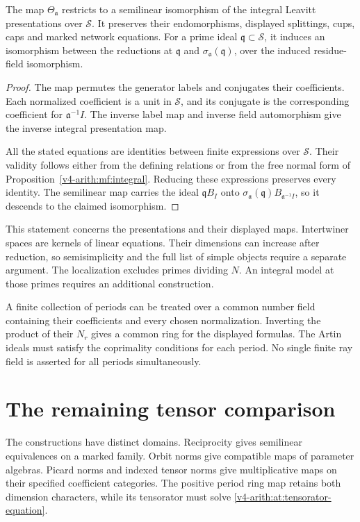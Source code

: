 \begin{proposition}\label{v4-arith:at:specialization}
The map \(\Theta_{\mathfrak a}\) restricts to a semilinear
isomorphism of the integral Leavitt presentations over
\(\mathcal S\). It preserves their endomorphisms, displayed
splittings, cups, caps and marked network equations.
For a prime ideal \(\mathfrak q\subset\mathcal S\), it induces
an isomorphism between the reductions at \(\mathfrak q\) and
\(\sigma_{\mathfrak a}(\mathfrak q)\), over the induced
residue-field isomorphism.
\end{proposition}
\begin{proof}
The map permutes the generator labels and conjugates their
coefficients. Each normalized coefficient is a unit in
\(\mathcal S\), and its conjugate is the corresponding
coefficient for \(\mathfrak a^{-1}I\).
The inverse label map and inverse field automorphism give the
inverse integral presentation map.

All the stated equations are identities between finite
expressions over \(\mathcal S\).
Their validity follows either from the defining relations or
from the free normal form of
Proposition~\ref{v4-arith:mf:integral}.
Reducing these expressions preserves every identity.
The semilinear map carries the ideal
\(\mathfrak q B_I\) onto
\(\sigma_{\mathfrak a}(\mathfrak q)B_{\mathfrak a^{-1}I}\),
so it descends to the claimed isomorphism.
\end{proof}

This statement concerns the presentations and their displayed
maps. Intertwiner spaces are kernels of linear equations.
Their dimensions can increase after reduction, so semisimplicity
and the full list of simple objects require a separate argument.
The localization excludes primes dividing \(N\).
An integral model at those primes requires an additional construction.

A finite collection of periods can be treated over a common
number field containing their coefficients and every chosen
normalization. Inverting the product of their \(N_r\) gives
a common ring for the displayed formulas.
The Artin ideals must satisfy the coprimality conditions for
each period. No single finite ray field is asserted for all
periods simultaneously.

\section{The remaining tensor comparison}

The constructions have distinct domains.
Reciprocity gives semilinear equivalences on a marked family.
Orbit norms give compatible maps of parameter algebras.
Picard norms and indexed tensor norms give multiplicative maps
on their specified coefficient categories.
The positive period ring map retains both dimension characters,
while its tensorator must solve
\eqref{v4-arith:at:tensorator-equation}.

